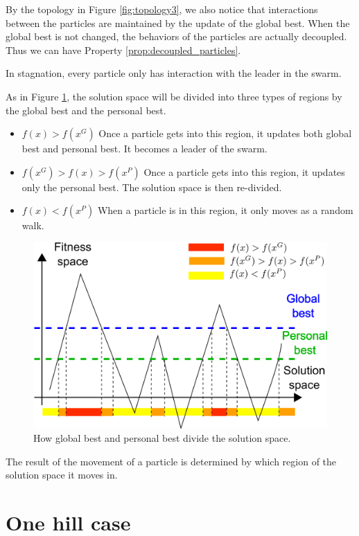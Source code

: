 By the topology in Figure \ref{fig:topology3}, we also notice that interactions between the particles are maintained by the update of the global best.
When the global best is not changed, the behaviors of the particles are actually decoupled.
Thus we can have Property \ref{prop:decoupled_particles}.

\begin{property}
\label{prop:decoupled_particles}
In stagnation, every particle only has interaction with the leader in the swarm.
\end{property}

As in Figure \ref{fig:categorize_regions}, the solution space will be divided into three types of regions by the global best and the personal best.
\begin{itemize}
\item $ f(x) > f(x^G) $
Once a particle gets into this region, it updates both global best and personal best. 
It becomes a leader of the swarm.
\item $ f(x^{G}) > f(x) > f(x^{P}) $
Once a particle gets into this region, it updates only the personal best.
The solution space is then re-divided.
\item $ f(x) < f(x^{P}) $
When a particle is in this region, it only moves as a random walk.
\end{itemize}

\begin{figure}
\centering
\includegraphics[width=0.7\linewidth]{./categorize_regions}
\caption{How global best and personal best divide the solution space.}
\label{fig:categorize_regions}
\end{figure}

The result of the movement of a particle is determined by which region of the solution space it moves in.

\section{One hill case}
\label{sec:one_hill_case}

